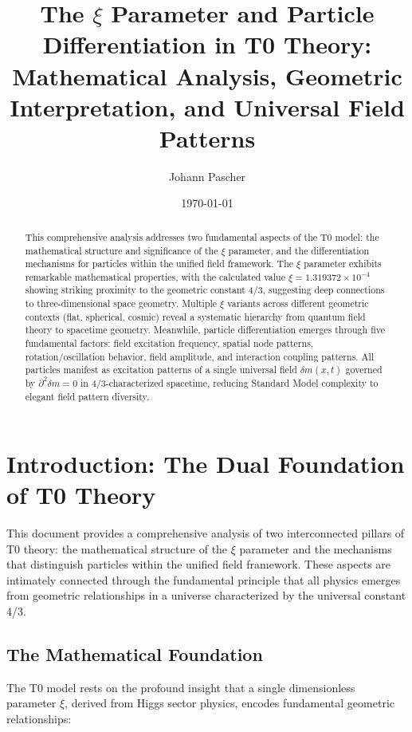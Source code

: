 \documentclass[12pt,a4paper]{article}
\title{The $\xi$ Parameter and Particle Differentiation in T0 Theory:\\
	\large Mathematical Analysis, Geometric Interpretation, and Universal Field Patterns}
\author{Johann Pascher}
\date{\today}
\newcommand{\mytimes}{\ensuremath{\times}}
\begin{document}
	
	\maketitle
	
	\begin{abstract}
		This comprehensive analysis addresses two fundamental aspects of the T0 model: the mathematical structure and significance of the $\xi$ parameter, and the differentiation mechanisms for particles within the unified field framework. The $\xi$ parameter exhibits remarkable mathematical properties, with the calculated value $\xi = 1.319372 \mytimes 10^{-4}$ showing striking proximity to the geometric constant 4/3, suggesting deep connections to three-dimensional space geometry. Multiple $\xi$ variants across different geometric contexts (flat, spherical, cosmic) reveal a systematic hierarchy from quantum field theory to spacetime geometry. Meanwhile, particle differentiation emerges through five fundamental factors: field excitation frequency, spatial node patterns, rotation/oscillation behavior, field amplitude, and interaction coupling patterns. All particles manifest as excitation patterns of a single universal field $\delta m(x,t)$ governed by $\partial^2\delta m = 0$ in 4/3-characterized spacetime, reducing Standard Model complexity to elegant field pattern diversity.
	\end{abstract}
	
	\tableofcontents
	\newpage
	
	\section{Introduction: The Dual Foundation of T0 Theory}
	\label{sec:introduction}
	
	This document provides a comprehensive analysis of two interconnected pillars of T0 theory: the mathematical structure of the $\xi$ parameter and the mechanisms that distinguish particles within the unified field framework. These aspects are intimately connected through the fundamental principle that all physics emerges from geometric relationships in a universe characterized by the universal constant 4/3.
	
	\subsection{The Mathematical Foundation}
	\label{subsec:mathematical_foundation}
	
	The T0 model rests on the profound insight that a single dimensionless parameter $\xi$, derived from Higgs sector physics, encodes fundamental geometric relationships:
	
\end{document}
